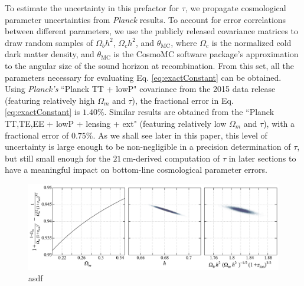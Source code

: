 \documentclass[twocolumn,aps,prd,nofootinbib,showpacs]{revtex4-1}
\begin{document}
To estimate the uncertainty in this prefactor for $\tau$, we propagate cosmological parameter uncertainties from \emph{Planck} results. To account for error correlations between different parameters, we use the publicly released covariance matrices to draw random samples of $\Omega_b h^2$, $\Omega_c h^2$, and $\theta_\textrm{MC}$, where $\Omega_c$ is the normalized cold dark matter density, and $\theta_\textrm{MC}$ is the CosmoMC software package's approximation to the angular size of the sound horizon at recombination. From this set, all the parameters necessary for evaluating Eq. \eqref{eq:exactConstant} can be obtained. Using \emph{Planck's} ``Planck TT + lowP" covariance from the 2015 data release (featuring relatively high $\Omega_m$ and $\tau$), the fractional error in Eq. \eqref{eq:exactConstant} is $1.40\%$. Similar results are obtained from the ``Planck TT,TE,EE + lowP + lensing + ext" (featuring relatively low $\Omega_m$ and $\tau$), with a fractional error of $0.75\%$. As we shall see later in this paper, this level of uncertainty is large enough to be non-negligible in a precision determination of $\tau$, but still small enough for the $21\,\textrm{cm}$-derived computation of $\tau$ in later sections to have a meaningful impact on bottom-line cosmological parameter errors.

\begin{figure}[!]
	\centering
	\includegraphics[width=1.0\textwidth,trim=0cm 0cm 0cm 0cm,clip]{figures/tauPrefac.pdf}
	\caption{asdf}
	\label{fig:tauPrefac}
\end{figure}
\end{document}
